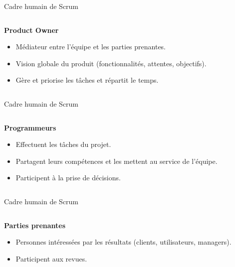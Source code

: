 \begin{frame}{Cadre humain de Scrum}
\begin{columns}
    \begin{column}{.4\textwidth}
        \hspace{2em}\textbf{Product Owner}
        \begin{itemize}
            \item Médiateur entre l'équipe et les parties prenantes.
            \item Vision globale du produit (fonctionnalités, attentes, objectifs).
            \item Gère et priorise les tâches et répartit le temps.
        \end{itemize}
    \end{column}%
    \begin{column}{.6\textwidth}
        \newcommand{\scrumfocus}{po}
        
    \end{column}
\end{columns}
\end{frame}

\begin{frame}{Cadre humain de Scrum}
\begin{columns}
    \begin{column}{.4\textwidth}
        \hspace{2em}\textbf{Programmeurs}
        \begin{itemize}
            \item Effectuent les tâches du projet.
            \item Partagent leurs compétences et les mettent au service de l'équipe.
            \item Participent à la prise de décisions.
        \end{itemize}
    \end{column}%
    \begin{column}{.6\textwidth}
        \newcommand{\scrumfocus}{prog}
        
    \end{column}
\end{columns}
\end{frame}

\begin{frame}{Cadre humain de Scrum}
\begin{columns}
    \begin{column}{.4\textwidth}
        \hspace{2em}\textbf{Parties prenantes}
        \begin{itemize}
            \item Personnes intéressées par les résultats (clients, utilisateurs, managers).
            \item Participent aux revues.
        \end{itemize}
    \end{column}%
    \begin{column}{.6\textwidth}
        \newcommand{\scrumfocus}{pp}
        
    \end{column}
\end{columns}
\end{frame}

